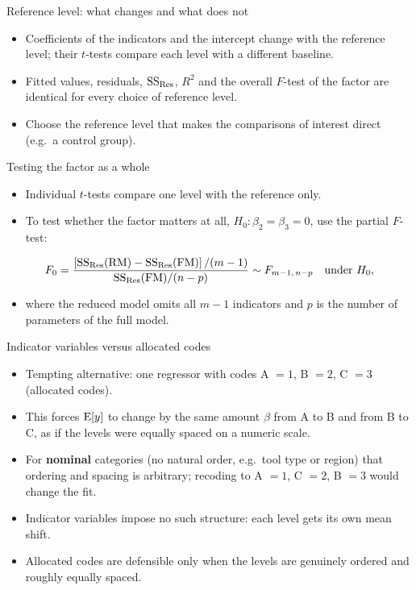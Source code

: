 \begin{frame}{Reference level: what changes and what does not}
    \begin{itemize}
        \item Coefficients of the indicators and the intercept change with the reference level; their $t$-tests compare each level with a different baseline.
        \item Fitted values, residuals, $\mathrm{SS}_{\mathrm{Res}}$, $R^2$ and the overall $F$-test of the factor are identical for every choice of reference level.
        \item Choose the reference level that makes the comparisons of interest direct (e.g.\ a control group).
    \end{itemize}
\end{frame}


\begin{frame}{Testing the factor as a whole}
    \begin{itemize}
        \item Individual $t$-tests compare one level with the reference only.
        \item To test whether the factor matters at all, $H_0\colon \beta_2 = \beta_3 = 0$, use the partial $F$-test:
    \end{itemize}
    \[
        F_0 = \frac{\left[\mathrm{SS}_{\mathrm{Res}}(\mathrm{RM}) - \mathrm{SS}_{\mathrm{Res}}(\mathrm{FM})\right]/(m-1)}{\mathrm{SS}_{\mathrm{Res}}(\mathrm{FM})/(n - p)} \sim F_{m-1,\, n-p} \quad \text{under } H_0,
    \]
    \begin{itemize}
        \item where the reduced model omits all $m-1$ indicators and $p$ is the number of parameters of the full model.
    \end{itemize}
\end{frame}


\begin{frame}{Indicator variables versus allocated codes}
    \begin{itemize}
        \item Tempting alternative: one regressor with codes A $= 1$, B $= 2$, C $= 3$ (allocated codes).
        \item This forces $\operatorname{E}[y]$ to change by the same amount $\beta$ from A to B and from B to C, as if the levels were equally spaced on a numeric scale.
        \item For \textbf{nominal} categories (no natural order, e.g.\ tool type or region) that ordering and spacing is arbitrary; recoding to A $= 1$, C $= 2$, B $= 3$ would change the fit.
        \item Indicator variables impose no such structure: each level gets its own mean shift.
        \item Allocated codes are defensible only when the levels are genuinely ordered and roughly equally spaced.
    \end{itemize}
\end{frame}


